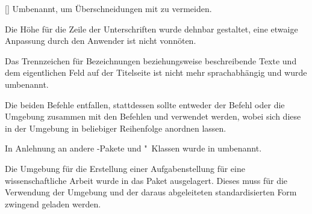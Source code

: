 \begin{Declaration}[v2.00]{[\PBoolean]}
%
Umbenannt, um Überschneidungen mit  zu vermeiden.
\end{Declaration}

\begin{Declaration}[v2.00]{}
%
Die Höhe für die Zeile der Unterschriften wurde dehnbar gestaltet, eine etwaige 
Anpassung durch den Anwender ist nicht vonnöten.
\end{Declaration}

\begin{Declaration}[v2.00]{}%
%
Das Trennzeichen für Bezeichnungen beziehungsweise beschreibende Texte und dem 
eigentlichen Feld auf der Titelseite ist nicht mehr sprachabhängig und wurde 
umbenannt.
\end{Declaration}

\begin{Declaration}[v2.00]{}
\begin{Declaration}[v2.00]{}
%
Die beiden Befehle entfallen, stattdessen sollte entweder der Befehl 
 oder die Umgebung  zusammen mit 
den Befehlen  und  verwendet werden, 
wobei sich diese in der Umgebung in beliebiger Reihenfolge anordnen lassen.
\end{Declaration}
\end{Declaration}

\begin{Declaration}[v2.00]{}{%
}
\printdeclarationlist*%
In Anlehnung an andere -Pakete und "~Klassen wurde 
 in  umbenannt.
\end{Declaration}

\minisec{\taskname}
Die Umgebung für die Erstellung einer Aufgabenstellung für eine 
wissenschaftliche Arbeit wurde in das Paket  
ausgelagert. Dieses muss für die Verwendung der Umgebung  
und der daraus abgeleiteten standardisierten Form zwingend geladen werden.

